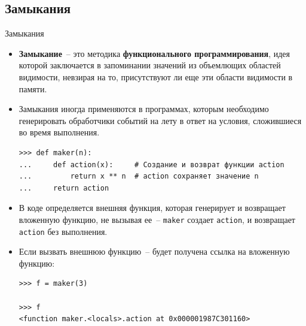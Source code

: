 \documentclass[aspectratio=169]{beamer}%
\begin{document}
\subsection{Замыкания}
\begin{frame}[fragile]{Замыкания}
\scriptsize
\begin{itemize}
\item \textcolor{extraorange}{\textbf{Замыкание}}~-- это методика \textbf{функционального программирования}, идея которой заключается в запоминании значений из объемлющих областей видимости, невзирая на то, присутствуют ли еще эти области видимости в памяти.
\item Замыкания иногда применяются в программах, которым необходимо генерировать обработчики событий на лету в ответ на условия, сложившиеся во время выполнения.

\begin{verbatim}
>>> def maker(n):
...     def action(x):     # Создание и возврат функции action
...         return x ** n  # action сохраняет значение n
...     return action
\end{verbatim}
\item В коде определяется внешняя функция, которая генерирует и возвращает вложенную функцию, не вызывая ее~-- \texttt{maker} создает \texttt{action}, и возвращает \texttt{action} без выполнения. 
\item Если вызвать внешнюю функцию~-- будет получена ссылка на вложенную функцию:

\begin{verbatim}
>>> f = maker(3)

>>> f
<function maker.<locals>.action at 0x000001987C301160>
\end{verbatim}
\end{itemize}
\vfill
\end{frame}
\end{document}

